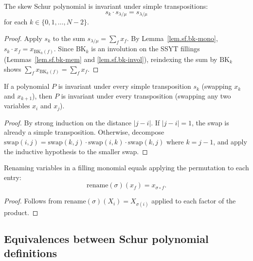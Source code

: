 \begin{lemma}
\label{lem.sf.skew-schur-swap-inv}
\leanhelper
\leanok
The skew Schur polynomial is invariant under simple transpositions:
\[
  s_k \cdot s_{\lambda/\mu} = s_{\lambda/\mu}
\]
for each $k \in \{0, 1, \ldots, N{-}2\}$.
\end{lemma}

\begin{proof}
Apply $s_k$ to the sum $s_{\lambda/\mu} = \sum_f x_f$.
By Lemma~\ref{lem.sf.bk-mono}, $s_k \cdot x_f = x_{\mathrm{BK}_k(f)}$.
Since $\mathrm{BK}_k$ is an involution on the SSYT fillings
(Lemmas~\ref{lem.sf.bk-mem} and \ref{lem.sf.bk-invol}),
reindexing the sum by $\mathrm{BK}_k$ shows
$\sum_f x_{\mathrm{BK}_k(f)} = \sum_f x_f$.
\end{proof}

\begin{lemma}
\label{lem.sf.simples-enough-sb}
If a polynomial $P$ is invariant under every simple transposition $s_k$
(swapping $x_k$ and $x_{k+1}$), then $P$ is invariant under every
transposition (swapping any two variables $x_i$ and $x_j$).
\end{lemma}

\begin{proof}
By strong induction on the distance $|j - i|$.
If $|j - i| = 1$, the swap is already a simple transposition.
Otherwise, decompose $\mathrm{swap}(i, j) = \mathrm{swap}(k, j) \cdot \mathrm{swap}(i, k) \cdot \mathrm{swap}(k, j)$
where $k = j - 1$, and apply the inductive hypothesis to the smaller swap.
\end{proof}

\begin{lemma}
\label{lem.sf.rename-filling-monomial}
\leanhelper
\leanok
Renaming variables in a filling monomial equals applying the permutation to each entry:
\[
  \mathrm{rename}(\sigma)(x_f) = x_{\sigma \circ f}.
\]
\end{lemma}

\begin{proof}
\leanok
Follows from $\mathrm{rename}(\sigma)(X_i) = X_{\sigma(i)}$ applied to each factor of the product.
\end{proof}

\subsection{Equivalences between Schur polynomial definitions}

